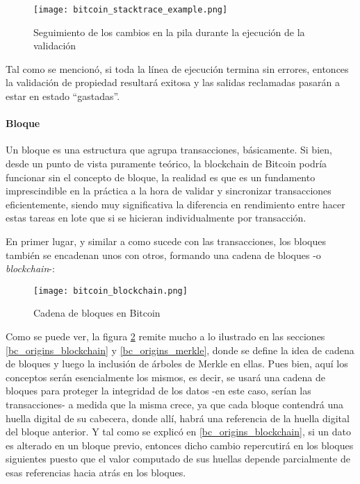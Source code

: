 \begin{figure}[H]
  \texttt{[image: bitcoin\_stacktrace\_example.png]}
  \centering
  \caption{Seguimiento de los cambios en la pila durante la ejecución de la validación}
  \label{fig:bitcoin-stacktrace-example}
\end{figure}

Tal como se mencionó, si toda la línea de ejecución termina sin errores, entonces la validación de propiedad resultará exitosa y las salidas reclamadas pasarán a estar en estado ``gastadas''.

\paragraph{Bloque}
\label{bc_bitcoin_block}

Un bloque es una estructura que agrupa transacciones, básicamente. Si bien, desde un punto de vista puramente teórico, la blockchain de Bitcoin podría funcionar sin el concepto de bloque, la realidad es que es un fundamento imprescindible en la práctica a la hora de validar y sincronizar transacciones eficientemente, siendo muy significativa la diferencia en rendimiento entre hacer estas tareas en lote que si se hicieran individualmente por transacción.

En primer lugar, y similar a como sucede con las transacciones, los bloques también se encadenan unos con otros, formando una cadena de bloques -o \textit{blockchain}-:

\begin{figure}[H]
  \texttt{[image: bitcoin\_blockchain.png]}
  \centering
  \caption{Cadena de bloques en Bitcoin}
  \label{fig:bitcoin-blockchain}
\end{figure}

Como se puede ver, la figura \ref{fig:bitcoin-blockchain} remite mucho a lo ilustrado en las secciones \ref{bc_origins_blockchain} y \ref{bc_origins_merkle}, donde se define la idea de cadena de bloques y luego la inclusión de árboles de Merkle en ellas. Pues bien, aquí los conceptos serán esencialmente los mismos, es decir, se usará una cadena de bloques para proteger la integridad de los datos -en este caso, serían las transacciones- a medida que la misma crece, ya que cada bloque contendrá una huella digital de su cabecera, donde allí, habrá una referencia de la huella digital del bloque anterior. Y tal como se explicó en \ref{bc_origins_blockchain}, si un dato es alterado en un bloque previo, entonces dicho cambio repercutirá en los bloques siguientes puesto que el valor computado de sus huellas depende parcialmente de esas referencias hacia atrás en los bloques.

